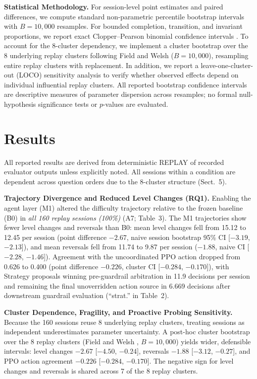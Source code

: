 \documentclass[runningheads]{llncs}
\begin{document}
\textbf{Statistical Methodology.} For session-level point estimates and paired differences, we compute standard non-parametric percentile bootstrap intervals with $B=10{,}000$ resamples. For bounded completion, transition, and invariant proportions, we report exact Clopper--Pearson binomial confidence intervals \cite{clopper1934}. To account for the 8-cluster dependency, we implement a cluster bootstrap over the 8 underlying replay clusters following Field and Welsh \cite{field2007} ($B=10{,}000$), resampling entire replay clusters with replacement. In addition, we report a leave-one-cluster-out (LOCO) sensitivity analysis to verify whether observed effects depend on individual influential replay clusters. All reported bootstrap confidence intervals are descriptive measures of parameter dispersion across resamples; no formal null-hypothesis significance tests or $p$-values are evaluated.

\section{Results}

All reported results are derived from deterministic REPLAY of recorded evaluator outputs unless explicitly noted. All sessions within a condition are dependent across question orders due to the 8-cluster structure (Sect.~5).

\textbf{Trajectory Divergence and Reduced Level Changes (RQ1).} Enabling the agent layer (M1) altered the difficulty trajectory relative to the frozen baseline (B0) in \emph{all 160 replay sessions (100\%)} (A7; Table~3). The M1 trajectories show fewer level changes and reversals than B0: mean level changes fell from 15.12 to 12.45 per session (point difference $-2.67$, naive session bootstrap 95\% CI [$-3.19$, $-2.13$]), and mean reversals fell from 11.74 to 9.87 per session ($-1.88$, naive CI [$-2.28$, $-1.46$]). Agreement with the uncoordinated PPO action dropped from 0.626 to 0.400 (point difference $-0.226$, cluster CI [$-0.284$, $-0.170$]), with Strategy proposals winning pre-guardrail arbitration in 11.9 decisions per session and remaining the final unoverridden action source in 6.669 decisions after downstream guardrail evaluation (``strat.'' in Table~2).

\textbf{Cluster Dependence, Fragility, and Proactive Probing Sensitivity.} Because the 160 sessions reuse 8 underlying replay clusters, treating sessions as independent underestimates parameter uncertainty. A post-hoc cluster bootstrap over the 8 replay clusters (Field and Welsh \cite{field2007}, $B=10{,}000$) yields wider, defensible intervals: level changes $-2.67$ [$-4.50$, $-0.24$], reversals $-1.88$ [$-3.12$, $-0.27$], and PPO action agreement $-0.226$ [$-0.284$, $-0.170$]. The negative sign for level changes and reversals is shared across 7 of the 8 replay clusters.
\end{document}
